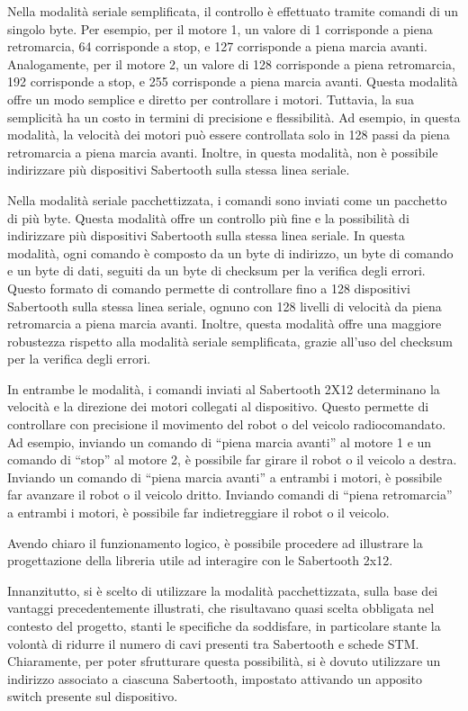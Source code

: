 \documentclass{article}
\begin{document}
          Nella modalità seriale semplificata, il controllo è effettuato tramite comandi di un singolo byte. Per esempio, per il motore 1, un valore di 1 corrisponde a piena retromarcia, 64 corrisponde a stop, e 127 corrisponde a piena marcia avanti. Analogamente, per il motore 2, un valore di 128 corrisponde a piena retromarcia, 192 corrisponde a stop, e 255 corrisponde a piena marcia avanti. Questa modalità offre un modo semplice e diretto per controllare i motori. Tuttavia, la sua semplicità ha un costo in termini di precisione e flessibilità. Ad esempio, in questa modalità, la velocità dei motori può essere controllata solo in 128 passi da piena retromarcia a piena marcia avanti. Inoltre, in questa modalità, non è possibile indirizzare più dispositivi Sabertooth sulla stessa linea seriale.

          Nella modalità seriale pacchettizzata, i comandi sono inviati come un pacchetto di più byte. Questa modalità offre un controllo più fine e la possibilità di indirizzare più dispositivi Sabertooth sulla stessa linea seriale. In questa modalità, ogni comando è composto da un byte di indirizzo, un byte di comando e un byte di dati, seguiti da un byte di checksum per la verifica degli errori. Questo formato di comando permette di controllare fino a 128 dispositivi Sabertooth sulla stessa linea seriale, ognuno con 128 livelli di velocità da piena retromarcia a piena marcia avanti. Inoltre, questa modalità offre una maggiore robustezza rispetto alla modalità seriale semplificata, grazie all’uso del checksum per la verifica degli errori.

          In entrambe le modalità, i comandi inviati al Sabertooth 2X12 determinano la velocità e la direzione dei motori collegati al dispositivo. Questo permette di controllare con precisione il movimento del robot o del veicolo radiocomandato. Ad esempio, inviando un comando di “piena marcia avanti” al motore 1 e un comando di “stop” al motore 2, è possibile far girare il robot o il veicolo a destra. Inviando un comando di “piena marcia avanti” a entrambi i motori, è possibile far avanzare il robot o il veicolo dritto. Inviando comandi di “piena retromarcia” a entrambi i motori, è possibile far indietreggiare il robot o il veicolo. 

          Avendo chiaro il funzionamento logico, è possibile procedere ad illustrare la progettazione della libreria utile ad interagire con le Sabertooth 2x12. 

          Innanzitutto, si è scelto di utilizzare la modalità pacchettizzata, sulla base dei vantaggi precedentemente illustrati, che risultavano quasi scelta obbligata nel contesto del progetto, stanti le specifiche da soddisfare, in particolare stante la volontà di ridurre il numero di cavi presenti tra Sabertooth e schede STM. Chiaramente, per poter sfrutturare questa possibilità, si è dovuto utilizzare un indirizzo associato a ciascuna Sabertooth, impostato attivando un apposito switch presente sul dispositivo. 
\end{document}
